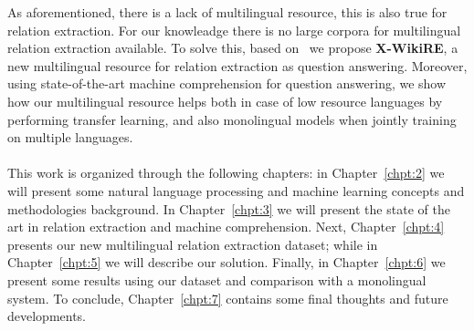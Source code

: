 As aforementioned, there is a lack of multilingual resource, this is also true for relation extraction. For our knowleadge there is no large corpora for multilingual relation extraction available. To solve this, based on~\citep{levy2017zero, hewlett2016wikireading} we propose \textbf{X-WikiRE}, a new multilingual resource for relation extraction as question answering. Moreover, using state-of-the-art machine comprehension for question answering, we show how our multilingual resource helps both in case of low resource languages by performing transfer learning, and also monolingual models when jointly training on multiple languages.




\paragraph{}
This work is organized through the following chapters: in Chapter~\ref{chpt:2} we will present some natural language processing and machine learning concepts and methodologies background. In Chapter~\ref{chpt:3} we will present the state of the art in relation extraction and machine comprehension. Next, Chapter~\ref{chpt:4} presents our new multilingual relation extraction dataset; while in Chapter~\ref{chpt:5} we will describe our solution. Finally, in Chapter~\ref{chpt:6} we present some results using our dataset and comparison with a monolingual system. To conclude, Chapter~\ref{chpt:7} contains some final thoughts and future developments.